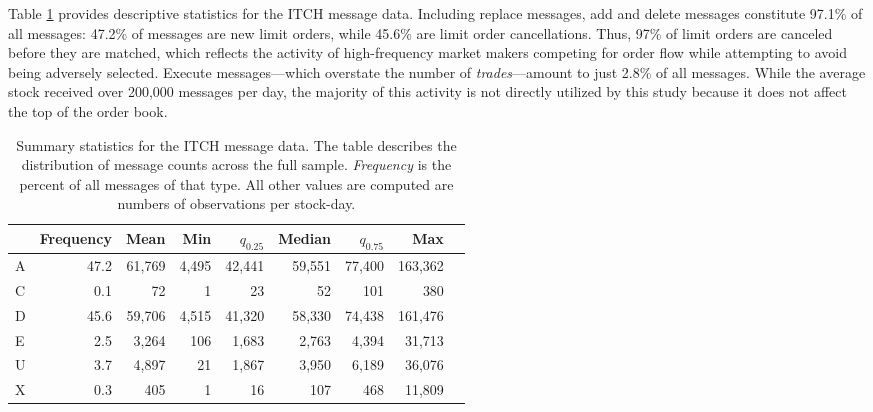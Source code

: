 	Table \ref{tab:message_counts} provides descriptive statistics for the ITCH message data. Including replace messages, add and delete messages constitute 97.1\% of all messages: 47.2\% of messages are new limit orders, while 45.6\% are limit order cancellations. Thus, 97\% of limit orders are canceled before they are matched, which reflects the activity of high-frequency market makers competing for order flow while attempting to avoid being adversely selected. Execute messages---which overstate the number of \textit{trades}---amount to just 2.8\% of all messages. While the average stock received over 200,000 messages per day, the majority of this activity is not directly utilized by this study because it does not affect the top of the order book.

	\begin{table}[t]
		\small
		\linespread{1}
		\centering
		\begin{tabular*}{\textwidth}{@{\extracolsep{\fill}}lrrrrrrrr}
			\toprule{}
			 &  Frequency  &   Mean  & Min &  $q_{0.25}$ &  Median &    $q_{0.75}$   &        Max \\
			\midrule
			A &  47.2  &  61,769 &  4,495 &  42,441 &  59,551 &  77,400 &  163,362 \\
			C &  0.1   &      72 &     1  &      23 &      52 &     101 &      380 \\
			D &  45.6  &  59,706 &  4,515 &  41,320 &  58,330 &  74,438 &  161,476 \\
			E &  2.5   &   3,264 &   106  &   1,683 &   2,763 &   4,394 &   31,713 \\
			U &  3.7   &   4,897 &     21 &   1,867 &   3,950 &   6,189 &   36,076 \\
			X &  0.3   &     405 &      1 &      16 &     107 &     468 &   11,809 \\
			\bottomrule
		\end{tabular*}
		\captionsetup{position=below, font=footnotesize, justification=justified, width=\linewidth}
		\caption[Summary statistics for the ITCH message data]{Summary statistics for the ITCH message data. The table describes the distribution of message counts across the full sample. \textit{Frequency} is the percent of all messages of that type. All other values are computed are numbers of observations per stock-day.}
		\label{tab:message_counts}
	\end{table}

